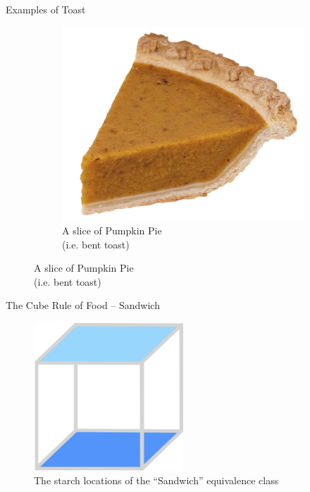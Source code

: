 \documentclass{beamer}
\begin{document}
\begin{frame}{Examples of Toast}
\begin{figure}
        \begin{subfigure}{.4\textwidth}
          \centering
          \includegraphics[width=.7\linewidth]{toast/17_pumpkin_pie_slice.jpg}
          \caption{\label{fig:pumpkin-pie}A slice of Pumpkin Pie\\\quad\quad(i.e. bent toast)}
        \end{subfigure}
    \end{figure}
\end{frame}


\begin{frame}{The Cube Rule of Food -- Sandwich}
    \begin{figure}
        \includegraphics[width=0.5\textwidth]{sandwich/18_sandwich.jpg}
        \caption{\label{fig:sandwich-diagram}The starch locations of the ``Sandwich'' equivalence class}
    \end{figure}
\end{frame}
\end{document}
